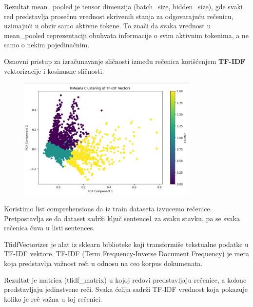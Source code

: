 \documentclass{article}
\begin{document}
Rezultat mean\_pooled je tensor dimenzija (batch\_size, hidden\_size), gde svaki red predstavlja prosečnu vrednost skrivenih stanja za odgovarajuću rečenicu, uzimajući u obzir samo aktivne tokene. To znači da svaka vrednost u mean\_pooled reprezentaciji obuhvata informacije o svim aktivnim tokenima, a ne samo o nekim pojedinačnim.
\newline
\newline


Osnovni pristup za izračunavanje sličnosti između rečenica korišćenjem \textbf{TF-IDF} vektorizacije i kosinusne sličnosti.




\begin{figure}[h]
    \centering 
    \includegraphics[width=0.8\textwidth]{ri7.jpeg} 
\end{figure}

Koristimo list comprehensions da iz train dataseta izvucemo rečenice. Pretpostavlja se da dataset sadrži ključ sentence1 za svaku stavku, pa se svaka rečenica čuva u listi sentences.
\newline
\newline

TfidfVectorizer je alat iz sklearn biblioteke koji transformiše tekstualne podatke u TF-IDF vektore. TF-IDF (Term Frequency-Inverse Document Frequency) je mera koja predstavlja važnost reči u odnosu na ceo korpus dokumenata.
\newline
\newline

Rezultat je matrica (tfidf\_matrix) u kojoj redovi predstavljaju rečenice, a kolone predstavljaju jedinstvene reči. Svaka ćelija sadrži TF-IDF vrednost koja pokazuje koliko je reč važna u toj rečenici.
\newline
\newline
\end{document}
